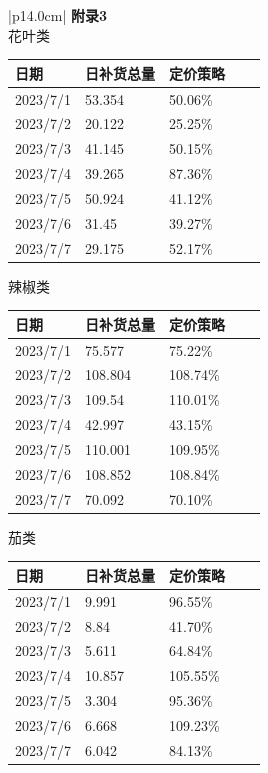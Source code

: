 \documentclass{my_paper}
\begin{document}
\begin{table}[H]
    \centering
    \begin{tabular}{|p{14.0cm}|}
    \hline
    \textbf{附录3} \\ 
    \hline
花叶类
\begin{table}[H]
\begin{tabular}{lllll}
\toprule
日期       & 日补货总量  & 定价策略    &  &  \\
\midrule
2023/7/1 & 53.354 & 50.06\% &  &  \\
2023/7/2 & 20.122 & 25.25\% &  &  \\
2023/7/3 & 41.145 & 50.15\% &  &  \\
2023/7/4 & 39.265 & 87.36\% &  &  \\
2023/7/5 & 50.924 & 41.12\% &  &  \\
2023/7/6 & 31.45  & 39.27\% &  &  \\
2023/7/7 & 29.175 & 52.17\% &  & \\
\bottomrule
\end{tabular}
\end{table}

辣椒类
\begin{table}[H]
\begin{tabular}{lllll}
\toprule
日期       & 日补货总量   & 定价策略     &  &  \\
\midrule
2023/7/1 & 75.577  & 75.22\%  &  &  \\
2023/7/2 & 108.804 & 108.74\% &  &  \\
2023/7/3 & 109.54  & 110.01\% &  &  \\
2023/7/4 & 42.997  & 43.15\%  &  &  \\
2023/7/5 & 110.001 & 109.95\% &  &  \\
2023/7/6 & 108.852 & 108.84\% &  &  \\
2023/7/7 & 70.092  & 70.10\%  &  & \\
\bottomrule
\end{tabular}
\end{table}

茄类
\begin{table}[H]

\begin{tabular}{lllll}
\toprule
日期       & 日补货总量  & 定价策略     &  &  \\
\midrule
2023/7/1 & 9.991  & 96.55\%  &  &  \\
2023/7/2 & 8.84   & 41.70\%  &  &  \\
2023/7/3 & 5.611  & 64.84\%  &  &  \\
2023/7/4 & 10.857 & 105.55\% &  &  \\
2023/7/5 & 3.304  & 95.36\%  &  &  \\
2023/7/6 & 6.668  & 109.23\% &  &  \\
2023/7/7 & 6.042  & 84.13\%  &  & \\
\bottomrule
\end{tabular}
\end{table}


    \\
    \\
\hline
    \end{tabular}
\end{table}\newpage
\end{document}
